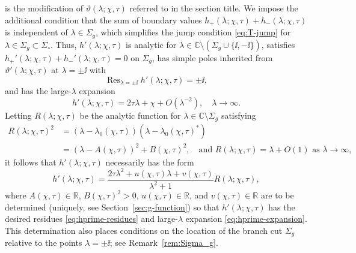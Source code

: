 is the modification of $\vartheta(\lambda;\chi,\tau)$ referred to in the section title.  
We impose the additional condition that the sum of boundary values $h_+(\lambda;\chi,\tau)+h_-(\lambda;\chi,\tau)$ is independent of $\lambda\in\Sigma_g$, which simplifies the jump condition \eqref{eq:T-jump} for $\lambda\in\Sigma_g\subset\Sigma_\circ$.  Thus, $h'(\lambda;\chi,\tau)$ is analytic for $\lambda\in\mathbb{C}\setminus(\Sigma_g\cup\{\ii,-\ii\})$, satisfies $h_+'(\lambda;\chi,\tau)+h_-'(\lambda;\chi,\tau)=0$ on $\Sigma_g$, has simple poles inherited from $\vartheta'(\lambda;\chi,\tau)$ at $\lambda=\pm\ii$ with
\begin{equation}
\mathop{\mathrm{Res}}_{\lambda=\pm \ii}h'(\lambda;\chi,\tau)=\pm \ii,
\label{eq:hprime-residues}
\end{equation}
and has the large-$\lambda$ expansion
\begin{equation}
h'(\lambda;\chi,\tau)=2\tau\lambda+\chi + O(\lambda^{-2}),\quad\lambda\to\infty.
\label{eq:hprime-expansion}
\end{equation}
Letting $R(\lambda;\chi,\tau)$ be the analytic function for $\lambda\in\mathbb{C}\setminus\Sigma_g$ satisfying 
\begin{equation}
\begin{split}
R(\lambda;\chi,\tau)^2&=(\lambda-\lambda_0(\chi,\tau))(\lambda-\lambda_0(\chi,\tau)^*)\\
&=(\lambda-A(\chi,\tau))^2+B(\chi,\tau)^2,\quad\text{and $R(\lambda;\chi,\tau)=\lambda + O(1)$ as $\lambda\to\infty$}, 
\end{split}
\label{eq:R-define}
\end{equation}
it follows that $h'(\lambda;\chi,\tau)$ necessarily has the form
\begin{equation}
h'(\lambda;\chi,\tau)=\frac{2\tau\lambda^2+u(\chi,\tau)\lambda+v(\chi,\tau)}{\lambda^2+1}R(\lambda;\chi,\tau),
\label{eq:hprime-formula}
\end{equation}
where $A(\chi,\tau)\in\mathbb{R}$, $B(\chi,\tau)^2>0$, $u(\chi,\tau)\in\mathbb{R}$, and $v(\chi,\tau)\in\mathbb{R}$ are to be determined (uniquely, see Section~\ref{sec:g-function}) so that $h'(\lambda;\chi,\tau)$ has the desired residues \eqref{eq:hprime-residues} and large-$\lambda$ expansion \eqref{eq:hprime-expansion}.  This determination also places conditions on the location of the branch cut $\Sigma_g$ relative to the points $\lambda=\pm\ii$; see Remark~\ref{rem:Sigma_g}.

